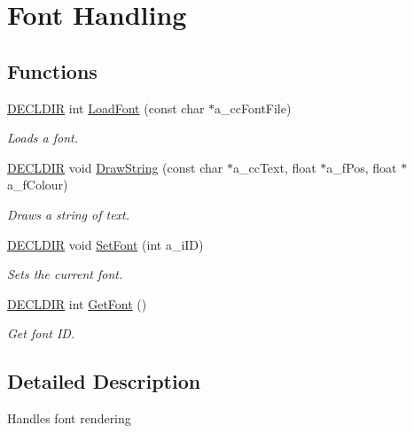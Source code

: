 \hypertarget{group___font}{\section{Font Handling}
\label{group___font}
}
\subsection*{Functions}
\begin{DoxyCompactItemize}
\item 
\hyperlink{_framework_8h_a6b6635274dbcf57e29a0140cd8cf0305}{D\-E\-C\-L\-D\-I\-R} int \hyperlink{group___font_ga4c1c55d8dd2fa635481f8fc088fb04a1}{Load\-Font} (const char $\ast$a\-\_\-cc\-Font\-File)
\begin{DoxyCompactList}\small\item\em Loads a font. \end{DoxyCompactList}\item 
\hyperlink{_framework_8h_a6b6635274dbcf57e29a0140cd8cf0305}{D\-E\-C\-L\-D\-I\-R} void \hyperlink{group___font_gaa2cfaf5adb82019dab223e4e523a5c1a}{Draw\-String} (const char $\ast$a\-\_\-cc\-Text, float $\ast$a\-\_\-f\-Pos, float $\ast$a\-\_\-f\-Colour)
\begin{DoxyCompactList}\small\item\em Draws a string of text. \end{DoxyCompactList}\item 
\hyperlink{_framework_8h_a6b6635274dbcf57e29a0140cd8cf0305}{D\-E\-C\-L\-D\-I\-R} void \hyperlink{group___font_ga5832b626753b26d77b572d6b5f03fc09}{Set\-Font} (int a\-\_\-i\-I\-D)
\begin{DoxyCompactList}\small\item\em Sets the current font. \end{DoxyCompactList}\item 
\hyperlink{_framework_8h_a6b6635274dbcf57e29a0140cd8cf0305}{D\-E\-C\-L\-D\-I\-R} int \hyperlink{group___font_ga74bb692ecc3244adc6f80e65559d2f0a}{Get\-Font} ()
\begin{DoxyCompactList}\small\item\em Get font I\-D. \end{DoxyCompactList}\end{DoxyCompactItemize}


\subsection{Detailed Description}
Handles font rendering 

